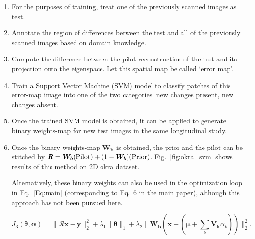 \documentclass{article}
\begin{document}
\begin{enumerate}
\item For the purposes of training, treat one of the previously scanned images as test.
\item Annotate the region of differences between the test and all of the previously scanned images based on domain knowledge.
\item Compute the difference between the pilot reconstruction of the test and its projection onto the eigenspace. Let this spatial map be called `error map'.
\item Train a Support Vector Machine (SVM) model to classify patches of this error-map image into one of the two categories: new changes present, new changes absent.
\item Once the trained SVM model is obtained, it can be applied to generate binary weights-map for new test images in the same longitudinal study.
\item Once the binary weights-map $\boldsymbol{W_b}$ is obtained, the prior and the pilot can be stitched by $\boldsymbol{R} = \boldsymbol{W_b}(\rm{Pilot}) + (1-\boldsymbol{W_b})(\rm{Prior})$. Fig.~\ref{fig:okra_svm} shows results of this method on 2D okra dataset.

  Alternatively, these binary weights can also be used in the optimization loop in Eq.~\ref{Eq:main} (corresponding to Eq.~6 in the main paper), although this approach has not been pursued here. 

\begin{equation}
J_3(\boldsymbol{\theta},\boldsymbol{\alpha}) = \lVert\boldsymbol{\mathcal{R} x}-\boldsymbol{y}\rVert_2^2  + \lambda_1\lVert\boldsymbol{\theta}\rVert_1 +\lambda_2\lVert\boldsymbol{W_b}(\boldsymbol{x} - (\boldsymbol{\mu} + \sum_{k}\boldsymbol{V_k}\alpha_k))\rVert_2^2.
\label{Eq:main}
\end{equation}

\end{enumerate} 
\end{document}
